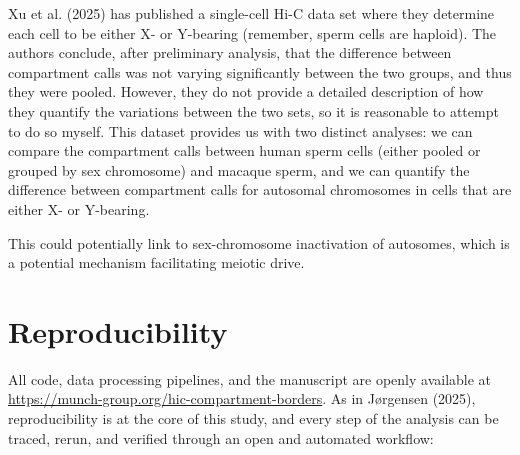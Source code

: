 \documentclass[
  10pt,
  a4paper,
  openany]{scrbook}
\begin{document}
Xu et al. (2025) has published a single-cell Hi-C data set where they
determine each cell to be either X- or Y-bearing (remember, sperm cells
are haploid). The authors conclude, after preliminary analysis, that the
difference between compartment calls was not varying significantly
between the two groups, and thus they were pooled. However, they do not
provide a detailed description of how they quantify the variations
between the two sets, so it is reasonable to attempt to do so myself.
This dataset provides us with two distinct analyses: we can compare the
compartment calls between human sperm cells (either pooled or grouped by
sex chromosome) and macaque sperm, and we can quantify the difference
between compartment calls for autosomal chromosomes in cells that are
either X- or Y-bearing.

This could potentially link to sex-chromosome inactivation of autosomes,
which is a potential mechanism facilitating meiotic drive.

\section{Reproducibility}\label{reproducibility}

All code, data processing pipelines, and the manuscript are openly
available at \url{https://munch-group.org/hic-compartment-borders}. As
in Jørgensen (2025), reproducibility is at the core of this study, and
every step of the analysis can be traced, rerun, and verified through an
open and automated workflow:
\end{document}

